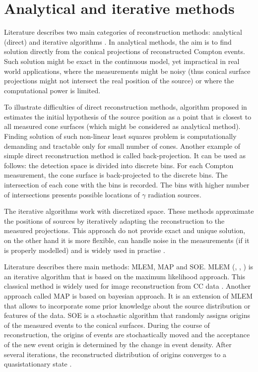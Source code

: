 \section{Analytical and iterative methods}
Literature describes two main categories of reconstruction methods: analytical (direct) and iterative algorithms \cite{lojacono2}.
In analytical methods, the aim is to find solution directly from the conical projections of reconstructed Compton events.
Such solution might be exact in the continuous model, yet impractical in real world applications, where the measurements might be noisy (thus conical surface projections might not intersect the real position of the source) or where the computational power is limited.

To illustrate difficulties of direct reconstruction methods, algorithm proposed in \cite{baca2019compton} estimates the initial hypothesis of the source position as a point that is closest to all measured cone surfaces (which might be considered as analytical method).
Finding solution of such non-linear least squares problem is computationally demanding and tractable only for small number of cones.
Another example of simple direct reconstruction method is called back-projection.
It can be used as follows:
the detection space is divided into discrete bins.
For each Compton measurement, the cone surface is back-projected to the discrete bins.
The intersection of each cone with the bins is recorded.
The bins with higher number of intersections presents possible locations of $\gamma$ radiation sources.

The iterative algorithms work with discretized space.
These methods  approximate the positions of sources by iteratively adapting the reconstruction to the measured projections.
This approach do not provide exact and unique solution, on the other hand it is more flexible, can handle noise in the measurements (if it is properly modelled) and is widely used in practise \cite{lojacono2}.

Literature describes there main methods: \ac{MLEM}, \ac{MAP} and \ac{SOE}.
\ac{MLEM} (\cite{MLEM_Shepp_1982}, \cite{MLEM_Lange_Carlson_1984}, \cite{MLEM_Wilderman_2000}) is an iterative algorithm that is based on the maximum likelihood approach.
This classical method is widely used for image reconstruction from \ac{CC} data \cite{maxim2016}.
Another approach called \ac{MAP} \cite{MLEM_Lange_Carlson_1984} is based on bayesian approach.
It is an extension of \ac{MLEM} that allows to incorporate some prior knowledge about the source distribution or features of the data.
\ac{SOE} is a stochastic algorithm that randomly assigns origins of the measured events to the conical surfaces.
During the course of reconstruction, the origins of events are stochastically moved and the acceptance of the new event origin is determined by the change in event density.
After several iterations, the reconstructed distribution of origins converges to a quasistationary state \cite{SOE_Andreyev_2009}.


